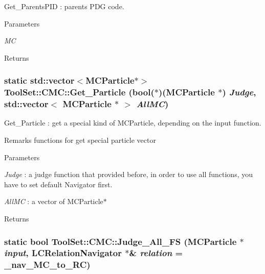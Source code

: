 Get\_\-ParentsPID : parents PDG code. 
\begin{DoxyParams}{Parameters}
\item[{\em MC}]\end{DoxyParams}
\begin{DoxyReturn}{Returns}

\end{DoxyReturn}
\hypertarget{classToolSet_1_1CMC_ae5e3cc992d63d6efb8030bdb170b87d1}{
\subsubsection[{Get\_\-Particle}]{\setlength{\rightskip}{0pt plus 5cm}static std::vector$<$MCParticle$\ast$$>$ ToolSet::CMC::Get\_\-Particle (bool($\ast$)(MCParticle $\ast$) {\em Judge}, \/  std::vector$<$ MCParticle $\ast$ $>$ {\em AllMC})}}
\label{classToolSet_1_1CMC_ae5e3cc992d63d6efb8030bdb170b87d1}


Get\_\-Particle : get a special kind of MCParticle, depending on the input function. \begin{DoxyRemark}{Remarks}
functions for get special particle vector
\end{DoxyRemark}

\begin{DoxyParams}{Parameters}
\item[{\em Judge}]: a judge function that provided before, in order to use all functions, you have to set default Navigator first. \item[{\em AllMC}]: a vector of MCParticle$\ast$\end{DoxyParams}
\begin{DoxyReturn}{Returns}

\end{DoxyReturn}
\hypertarget{classToolSet_1_1CMC_ad5ee7a4ddd73dca280d23d5656ac106d}{
\subsubsection[{Judge\_\-All\_\-FS}]{\setlength{\rightskip}{0pt plus 5cm}static bool ToolSet::CMC::Judge\_\-All\_\-FS (MCParticle $\ast$ {\em input}, \/  LCRelationNavigator $\ast$\& {\em relation} = {\ttfamily \_\-nav\_\-MC\_\-to\_\-RC})}}
\label{classToolSet_1_1CMC_ad5ee7a4ddd73dca280d23d5656ac106d}


